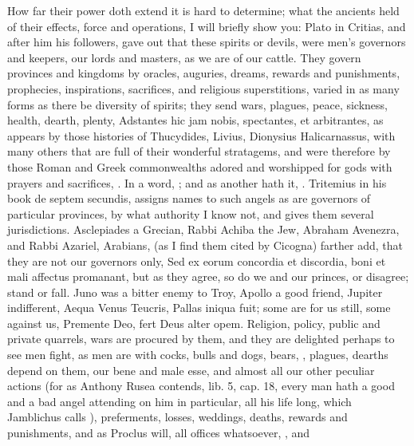 {{How far their power doth extend it is hard to determine; what the
ancients held of their effects, force and operations, I will briefly
show you: Plato in Critias, and after him his followers, gave out that
these spirits or devils, were men's governors and keepers, our lords
and masters, as we are of our cattle. They govern provinces and
kingdoms by oracles, auguries, dreams, rewards and punishments,
prophecies, inspirations, sacrifices, and religious superstitions,
varied in as many forms as there be diversity of spirits; they send
wars, plagues, peace, sickness, health, dearth, plenty, Adstantes
hic jam nobis, spectantes, et arbitrantes, \etc{} as appears by those
histories of Thucydides, Livius, Dionysius Halicarnassus, with many
others that are full of their wonderful stratagems, and were therefore
by those Roman and Greek commonwealths adored and worshipped for gods
with prayers and sacrifices, \etc{}. In a word, ; and as another hath it, . Tritemius in his book de
septem secundis, assigns names to such angels as are governors of
particular provinces, by what authority I know not, and gives them
several jurisdictions. Asclepiades a Grecian, Rabbi Achiba the Jew,
Abraham Avenezra, and Rabbi Azariel, Arabians, (as I find them cited by
Cicogna) farther add, that they are not our governors only, Sed
ex eorum concordia et discordia, boni et mali affectus promanant, but
as they agree, so do we and our princes, or disagree; stand or fall.
Juno was a bitter enemy to Troy, Apollo a good friend, Jupiter
indifferent, Aequa Venus Teucris, Pallas iniqua fuit; some are for us
still, some against us, Premente Deo, fert Deus alter opem. Religion,
policy, public and private quarrels, wars are procured by them, and
they are delighted perhaps to see men fight, as men are with
cocks, bulls and dogs, bears, \etc{}, plagues, dearths depend on them, our
bene and male esse, and almost all our other peculiar actions (for as
Anthony Rusea contends, lib. 5, cap. 18, every man hath a good and a
bad angel attending on him in particular, all his life long, which
Jamblichus calls ), preferments, losses, weddings, deaths,
rewards and punishments, and as Proclus will, all offices
whatsoever, , \etc{} and
}}
